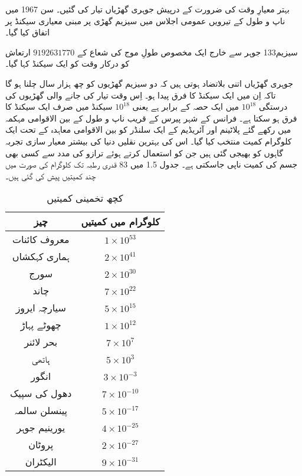 \documentclass[leqno, b5paper]{khalid-urdu-book}
\begin{document}
بہتر معیارِ وقت کی ضرورت کے درپیش جوہری گھڑیاں تیار کی گئیں۔ سن 1967 میں ناپ و طول کے تیرویں عمومی اجلاس میں سیزیم گھڑی پر مبنی معیاری سیکنڈ پر اتفاق کیا گیا۔

سیزیم133 جوہر سے خارج ایک مخصوص طولِ موج کی شعاع کے $\num{9192631770}$ ارتعاش کو درکار وقت کو ایک سیکنڈ کہا گیا۔

جوہری گھڑیاں اتنی بلاتضاد ہوتی ہیں کہ دو سیزیم گھڑیوں کو چھ ہزار سال چلنا ہو گا تاکہ اِن میں ایک سیکنڈ کا فرق پیدا ہو۔ اِس وقت تیار کی جانے والی گھڑیوں کی درستگی $10^{18}$ میں ایک حصہ کے برابر ہے یعنی $10^{18}$ سیکنڈ میں صرف ایک سیکنڈ کا فرق ہو سکتا ہے۔
فرانس کے شہر پیرس کے قریب ناپ و طول کے بین الاقوامی مہکمہ میں رکھے گئے پلاٹینم اور آئریڈیم کے ایک سلنڈر کو بین الاقوامی معاہدہ کے تحت ایک کلوگرام کمیت منتخب کیا گیا۔ اس کی بہترین نقلیں دنیا کی بیشتر معیار سازی تجربہ گاہوں کو بھیجی گئی ہیں جن کو استعمال کرتے ہوئے ترازو کی مدد سے کسی بھی جسم کی کمیت ناپی جاسکتی ہے۔ جدول 1.5 میں 83 قدری رطبہ تک کلوگرام کی صورت میں  چند کمیتیں پیش کی گئی ہیں۔
\begin{table}[h!]
	\centering
	\begin{tabular}{|c c|}
		\hline
		چیز & کلوگرام میں کمیتیں\\
		\hline\hline
		معروف کائنات & $1\times 10^{53}$\\
		\hline
		ہماری کہکشاں & $2\times 10^{41}$\\
		\hline
		سورج & $2\times 10^{30}$\\
		\hline
		چاند & $7\times 10^{22}$\\
		\hline
		سیارچہ ایروز & $5\times 10^{15}$\\
		\hline
		چھوٹے پہاڑ & $1\times 10^{12}$\\
		\hline
		بحر لائنر & $7\times10^{7}$\\
		\hline
		ہاتھی & $5\times10^{3}$\\
		\hline
		انگور & $3\times10^{-3}$\\
		\hline
		دھول کی سپیک & $7\times10^{-10}$\\
		\hline
		پینسلن سالمہ & $5\times10^{-17}$\\
		\hline
		یورینیم جوہر & $4\times10^{-25}$\\
		\hline
		 پروٹان & $2\times10^{-27}$\\
		 \hline
		 الیکٹران & $9\times10^{-31}$\\
		 \hline
	\end{tabular}
\caption{کچھ تخمینی کمیتیں}
\label{tab:my_label}
\end{table}
\end{document}
